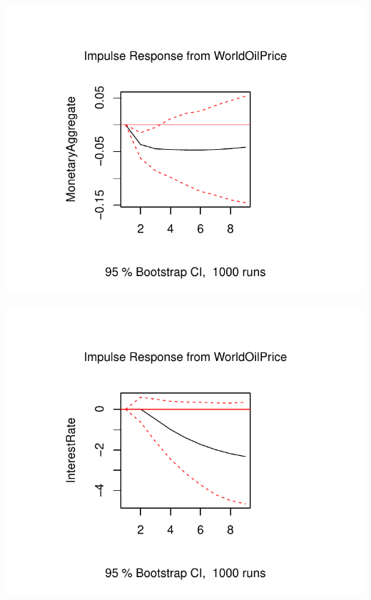 \documentclass[11pt,preprint, authoryear]{elsarticle}
\numberwithin{equation}{section}
\numberwithin{figure}{section}
\numberwithin{table}{section}
\begin{document}
\begin{center}\includegraphics{README_files/figure-latex/unnamed-chunk-16-1} \end{center}

\begin{center}\includegraphics{README_files/figure-latex/unnamed-chunk-16-2} \end{center}
\end{document}
